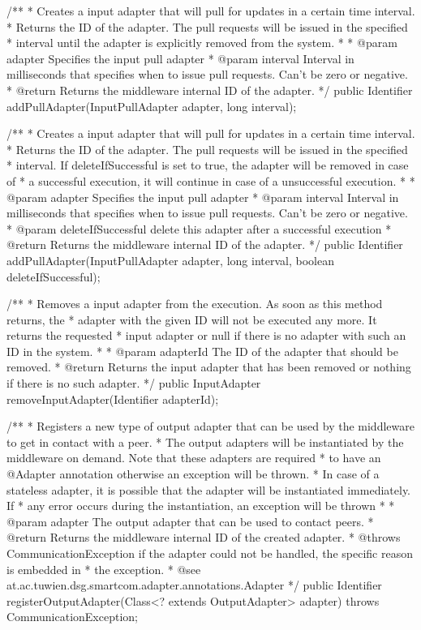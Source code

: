     /**
     * Creates a input adapter that will pull for updates in a certain time interval.
     * Returns the ID of the adapter. The pull requests will be issued in the specified
     * interval until the adapter is explicitly removed from the system.
     *
     * @param adapter  Specifies the input pull adapter
     * @param interval Interval in milliseconds that specifies when to issue pull requests. Can’t be zero or negative.
     * @return Returns the middleware internal ID of the adapter.
     */
    public Identifier addPullAdapter(InputPullAdapter adapter, long interval);

    /**
     * Creates a input adapter that will pull for updates in a certain time interval.
     * Returns the ID of the adapter. The pull requests will be issued in the specified
     * interval. If deleteIfSuccessful is set to true, the adapter will be removed in case of
     * a successful execution, it will continue in case of a unsuccessful execution.
     *
     * @param adapter  Specifies the input pull adapter
     * @param interval Interval in milliseconds that specifies when to issue pull requests. Can’t be zero or negative.
     * @param deleteIfSuccessful delete this adapter after a successful execution
     * @return Returns the middleware internal ID of the adapter.
     */
    public Identifier addPullAdapter(InputPullAdapter adapter, long interval, boolean deleteIfSuccessful);

    /**
     * Removes a input adapter from the execution. As soon as this method returns, the
     * adapter with the given ID will not be executed any more. It returns the requested
     * input adapter or null if there is no adapter with such an ID in the system.
     *
     * @param adapterId The ID of the adapter that should be removed.
     * @return Returns the input adapter that has been removed or nothing if there is no such adapter.
     */
    public InputAdapter removeInputAdapter(Identifier adapterId);

    /**
     * Registers a new type of output adapter that can be used by the middleware to get in contact with a peer.
     * The output adapters will be instantiated by the middleware on demand. Note that these adapters are required
     * to have an @Adapter annotation otherwise an exception will be thrown.
     * In case of a stateless adapter, it is possible that the adapter will be instantiated immediately. If
     * any error occurs during the instantiation, an exception will be thrown
     *
     * @param adapter The output adapter that can be used to contact peers.
     * @return Returns the middleware internal ID of the created adapter.
     * @throws CommunicationException if the adapter could not be handled, the specific reason is embedded in
     *                                the exception.
     * @see at.ac.tuwien.dsg.smartcom.adapter.annotations.Adapter
     */
    public Identifier registerOutputAdapter(Class<? extends OutputAdapter> adapter) throws CommunicationException;


